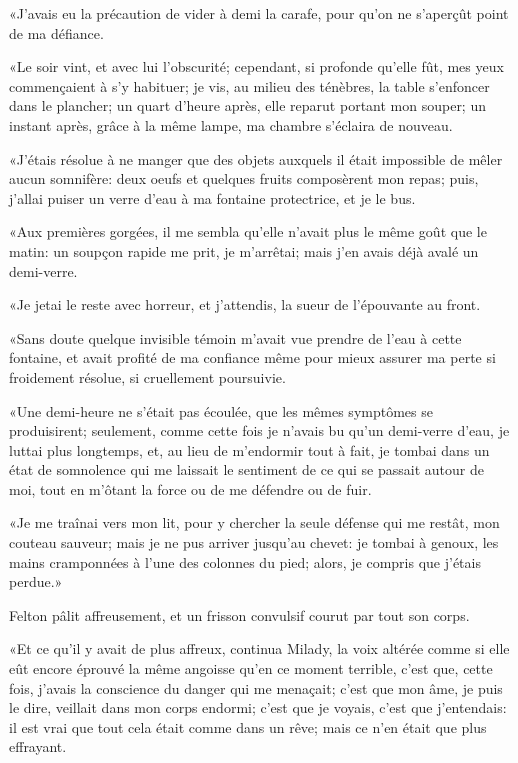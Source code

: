 «J'avais eu la précaution de vider à demi la carafe, pour qu'on ne s'aperçût point de ma défiance. 

«Le soir vint, et avec lui l'obscurité; cependant, si profonde qu'elle fût, mes yeux commençaient à s'y habituer; je vis, au milieu des ténèbres, la table s'enfoncer dans le plancher; un quart d'heure après, elle reparut portant mon souper; un instant après, grâce à la même lampe, ma chambre s'éclaira de nouveau. 

«J'étais résolue à ne manger que des objets auxquels il était impossible de mêler aucun somnifère: deux oeufs et quelques fruits composèrent mon repas; puis, j'allai puiser un verre d'eau à ma fontaine protectrice, et je le bus. 

«Aux premières gorgées, il me sembla qu'elle n'avait plus le même goût que le matin: un soupçon rapide me prit, je m'arrêtai; mais j'en avais déjà avalé un demi-verre. 

«Je jetai le reste avec horreur, et j'attendis, la sueur de l'épouvante au front. 

«Sans doute quelque invisible témoin m'avait vue prendre de l'eau à cette fontaine, et avait profité de ma confiance même pour mieux assurer ma perte si froidement résolue, si cruellement poursuivie. 

«Une demi-heure ne s'était pas écoulée, que les mêmes symptômes se produisirent; seulement, comme cette fois je n'avais bu qu'un demi-verre d'eau, je luttai plus longtemps, et, au lieu de m'endormir tout à fait, je tombai dans un état de somnolence qui me laissait le sentiment de ce qui se passait autour de moi, tout en m'ôtant la force ou de me défendre ou de fuir. 

«Je me traînai vers mon lit, pour y chercher la seule défense qui me restât, mon couteau sauveur; mais je ne pus arriver jusqu'au chevet: je tombai à genoux, les mains cramponnées à l'une des colonnes du pied; alors, je compris que j'étais perdue.» 

Felton pâlit affreusement, et un frisson convulsif courut par tout son corps. 

«Et ce qu'il y avait de plus affreux, continua Milady, la voix altérée comme si elle eût encore éprouvé la même angoisse qu'en ce moment terrible, c'est que, cette fois, j'avais la conscience du danger qui me menaçait; c'est que mon âme, je puis le dire, veillait dans mon corps endormi; c'est que je voyais, c'est que j'entendais: il est vrai que tout cela était comme dans un rêve; mais ce n'en était que plus effrayant. 

